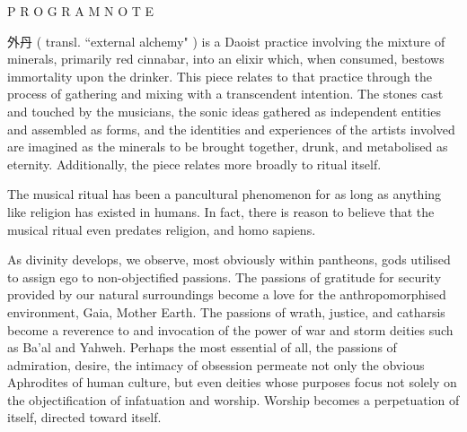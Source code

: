 \documentclass[12pt]{article}
\begin{document}
\begingroup
\begin{center}
\end{center}
\endgroup

\vspace{11\baselineskip}

\begingroup
\begin{center}
\huge P R O G R A M \hspace{4mm} N O T E
\end{center}
\endgroup

\vspace{3\baselineskip}

\begingroup
\hspace{4mm} {\setmainfont{Source Han Serif SC}\selectfont 外丹} ( transl. ``external alchemy" ) is a Daoist practice involving the mixture of minerals, primarily red cinnabar, into an elixir which, when consumed, bestows immortality upon the drinker. This piece relates to that practice through the process of gathering and mixing with a transcendent intention. The stones cast and touched by the musicians, the sonic ideas gathered as independent entities and assembled as forms, and the identities and experiences of the artists involved are imagined as the minerals to be brought together, drunk, and metabolised as eternity. Additionally, the piece relates more broadly to ritual itself. 

\endgroup
\begingroup
\hspace{4mm} The musical ritual has been a pancultural phenomenon for as long as anything like religion has existed in humans. In fact, there is reason to believe that the musical ritual even predates religion, and homo sapiens.
\endgroup

\begingroup
\hspace{4mm} As divinity develops, we observe, most obviously within pantheons, gods utilised to assign ego to non-objectified passions. The passions of gratitude for security provided by our natural surroundings become a love for the anthropomorphised environment, Gaia, Mother Earth. The passions of wrath, justice, and catharsis become a reverence to and invocation of the power of war and storm deities such as Ba'al and Yahweh. Perhaps the most essential of all, the passions of admiration, desire, the intimacy of obsession permeate not only the obvious Aphrodites of human culture, but even deities whose purposes focus not solely on the objectification of infatuation and worship. Worship becomes a perpetuation of itself, directed toward itself. 
\endgroup
\end{document}
